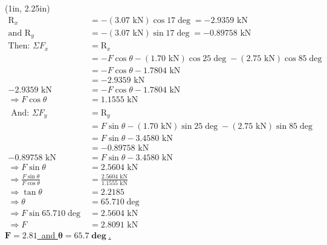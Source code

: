 \documentclass[10pt,oneside]{article}
\begin{document}
	\begin{textblock*}{3in}(1in, 2.25in)
		\large
		\begin{align*}
			\mathrm{R}_x &= -(3.07\text{ kN})\cos 17\deg = -2.9359\text{ kN}\\
			\text{and }\mathrm{R}_y &= -(3.07\text{ kN})\sin 17\deg = -0.89758\text{ kN}\\[0.25em]
			\text{Then: } \Sigma F_x &= \mathrm{R}_x \\[0.25em]
			&= -F\cos\theta - (1.70\text{ kN})\cos 25\deg - (2.75\text{ kN})\cos 85\deg\\[0.25em]
			&=-F\cos\theta - 1.7804\text{ kN}\\[0.25em]
			&= 	 -2.9359\text{ kN}\\[0.25em]
			 -2.9359\text{ kN} &= -F\cos\theta - 1.7804\text{ kN}\\[0.25em]
			\Rightarrow F\cos\theta &=  1.1555\text{ kN}\\\\
			\text{ And: } \Sigma F_y &= \mathrm{R}_y \\[0.25em]
			&= F\sin\theta - (1.70\text{ kN})\sin 25\deg - (2.75\text{ kN})\sin 85\deg\\[0.25em]
			&=F\sin\theta - 3.4580\text{ kN}\\[0.25em]
			&= 	 -0.89758\text{ kN}\\[0.25em]
			 -0.89758\text{ kN} &= F\sin\theta - 3.4580\text{ kN}\\[0.25em]
			\Rightarrow F\sin\theta &= 2.5604\text{ kN}\\[0.25em]
			\Rightarrow \frac{F\sin\theta}{F\cos\theta} &= \frac{2.5604\text{ kN}}{1.1555\text{ kN}}\\[0.25em]
			\Rightarrow \tan\theta &=  2.2185\\[0.25em]
			\Rightarrow \theta &= 65.710\deg\\[0.25em]
			\Rightarrow F\sin 65.710\deg &= 2.5604\text{ kN}\\[0.25em] \Rightarrow F &= 2.8091\text{ kN}
		\end{align*}
		\centering
		\underline{$\bm{F=2.81}$\, and $\bm{\theta=65.7\deg}$.}
	\end{textblock*}
\end{document}

